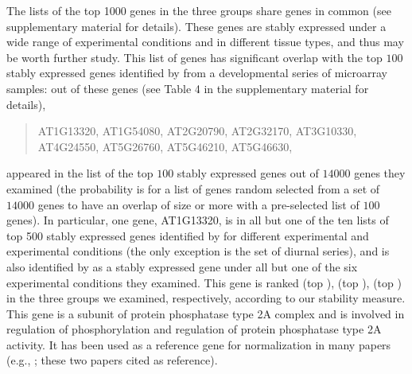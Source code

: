 	
	The lists of the top 1000 genes in the three groups share \overlapGene genes in common (see 
	supplementary material for details).  These
	genes are stably expressed under a wide range of experimental conditions and
	in different tissue types, and thus may be worth further study. This list of
	\overlapGene genes has significant overlap with the top $100$ stably expressed genes
	identified by \citet{czechowski2005genome} from a developmental series of
	microarray samples: \overlapGeneCze out of these \overlapGene genes (see Table 4 in the
	supplementary material for details),
	\begin{center}
		\begin{quote}
			AT1G13320, AT1G54080, AT2G20790, AT2G32170, AT3G10330,\\
			AT4G24550, AT5G26760, AT5G46210, AT5G46630, \\
		\end{quote}
	\end{center}
	appeared in the list of the top $100$ stably expressed genes
	out of $14000$ genes they examined (the probability is \overlapProb for
	a list of \overlapGene genes random selected from a set of $14000$ genes to have an
	overlap of size \overlapGeneCze or more with a pre-selected list of $100$ genes). In
	particular, one gene, AT1G13320, is in all but one of the ten lists of top 500 stably
	expressed genes identified by \citet{czechowski2005genome} for different
	experimental and experimental conditions (the only exception is the set of
	diurnal series), and is also identified by
	\citet{hong2010identification} as a stably expressed gene under all but one of the six
	experimental conditions they examined.  This gene is ranked \rankInSeedling (top 
	\rankTopPctSeedling), \rankInLeaf
	(top \rankTopPctLeaf), \rankInTissue (top \rankTopPctTissue) in the three
	groups we examined, respectively, according to our stability measure.
	This gene is a subunit of protein phosphatase type 2A complex and is involved in
	regulation of phosphorylation and regulation of protein phosphatase type 2A
	activity. It has been used as a reference gene for normalization in many
	papers (e.g., \citet{baron2012transcriptional,bournier2013arabidopsis};
	these two papers cited \citet{czechowski2005genome} as reference). 
	
